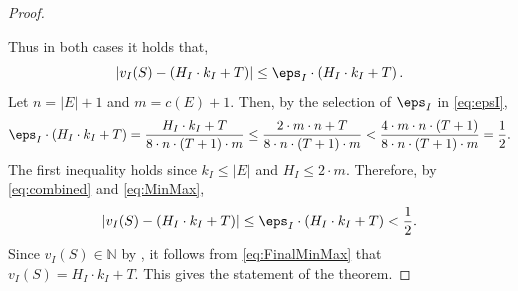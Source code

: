 \begin{proof}
\begin{enumerate}
	\end{enumerate} 
	Thus in both cases it holds that, 
	\begin{equation}
		\label{eq:combined}
		\left|	v_I(S)-\left(H_I \cdot k_I+T\right) \right|	\leq 	\eps_I \cdot \left(H_I \cdot k_I+T\right). 
	\end{equation}
	Let $n = |E|+1$ and $m = c(E)+1$. Then, by the selection of $\eps_I$ in \eqref{eq:epsI}, 
	\begin{equation}
		\label{eq:MinMax}
		\eps_I \cdot \left(H_I \cdot k_I+T\right) = \frac{H_I \cdot k_I+T}{8 \cdot n \cdot (T+1) \cdot m} 
		\leq\frac{2 \cdot m \cdot n + T}{8 \cdot n \cdot (T+1) \cdot m} 
		<\frac{4 \cdot m \cdot n \cdot (T+1)}{8 \cdot n \cdot (T+1) \cdot m} 
		= \frac{1}{2}. 
	\end{equation}
The first inequality holds since $k_I \leq |E|$ and $H_I \leq 2 \cdot m$.	Therefore, by \eqref{eq:combined} and \eqref{eq:MinMax}, 
	\begin{equation}
		\label{eq:FinalMinMax}
		  \left|	v_I(S)-\left(H_I \cdot k_I+T\right) \right|	\leq 	\eps_I \cdot \left(H_I \cdot k_I+T\right) <  \frac{1}{2}.
	\end{equation} Since $v_I(S) \in \mathbb{N}$ by , it follows from \eqref{eq:FinalMinMax} that $v_I(S) = H_I \cdot k_I+T$. This gives
	the statement of the theorem. 
\end{proof}

